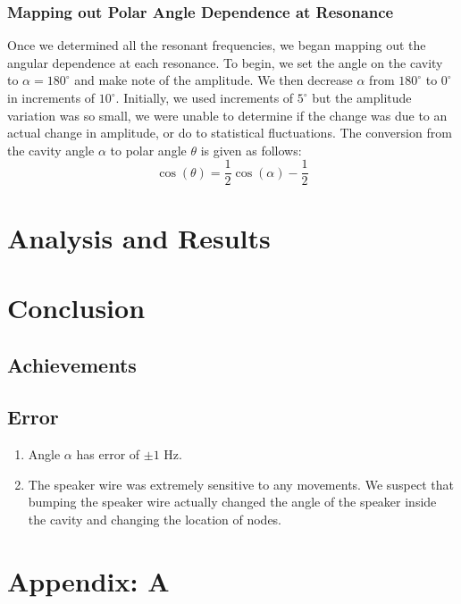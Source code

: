\documentclass[12pt]{article}
\renewcommand{\deg}{^\circ}
\begin{document}
			\subsubsection{Mapping out Polar Angle Dependence at Resonance}
			Once we determined all the resonant frequencies, we began mapping out the angular dependence at each resonance. To begin, we set the angle on the cavity to $\alpha = 180 \deg$ and make note of the amplitude. We then decrease $\alpha$ from $180 \deg$ to $0 \deg$ in increments of $10\deg$. Initially, we used increments of $5\deg$ but the amplitude variation was so small, we were unable to determine if the change was due to an actual change in amplitude, or do to statistical fluctuations. The conversion from the cavity angle $\alpha$ to polar angle $\theta$ is given as follows:
			\begin{equation}
			\label{alpha2theta}
				\cos(\theta) = \frac{1}{2}\cos(\alpha) - \frac{1}{2}
			\end{equation}
		
	\section{Analysis and Results}
	
	\section{Conclusion}
	
		\subsection{Achievements}
	
		\subsection{Error}
			
			\begin{enumerate}
				\item Angle $\alpha$ has error of $\pm 1$ Hz.
				
				\item The speaker wire was extremely sensitive to any movements. We suspect that bumping the speaker wire actually changed the angle of the speaker inside the cavity and changing the location of nodes.
			\end{enumerate}
		
	\section{Appendix: A}
	\label{Appendix: A}
\end{document}
